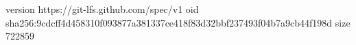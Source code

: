 version https://git-lfs.github.com/spec/v1
oid sha256:9cdcff4d458310f093877a381337ce418f83d32bbf237493f04b7a9cb44f198d
size 722859
